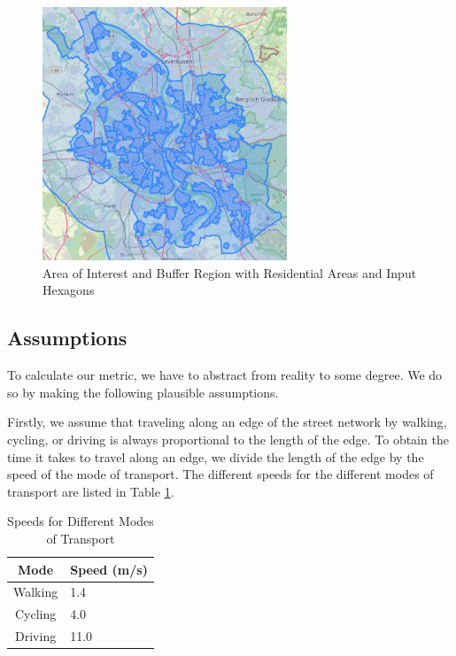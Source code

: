 \begin{figure}
  \begin{center}
    \includegraphics[width=0.65\textwidth]{Figures/experiment/input_hexagons_residential_areas.png}
  \end{center}
  \caption{Area of Interest and Buffer Region with Residential Areas and Input Hexagons}
  \label{fig:input_hexagons_residential_areas}
\end{figure}


\subsection{Assumptions}
\label{subs:assumptions}

To calculate our metric, we have to abstract from reality to some degree.
We do so by making the following plausible assumptions.

Firstly, we assume that traveling along an edge of the street network by walking, cycling, or driving is always proportional to the length of the edge.
To obtain the time it takes to travel along an edge, we divide the length of the edge by the speed of the mode of transport.
The different speeds for the different modes of transport are listed in Table \ref{table:speeds}.

\begin{table}[h]
\centering
\begin{tabular}{|c|l|}
\hline
\textbf{Mode} & \textbf{Speed (m/s)} \\
\hline
Walking & 1.4 \\
\hline
Cycling & 4.0 \\
\hline
Driving & 11.0 \\
\hline
\end{tabular}
\caption{Speeds for Different Modes of Transport}
\label{table:speeds}
\end{table}

